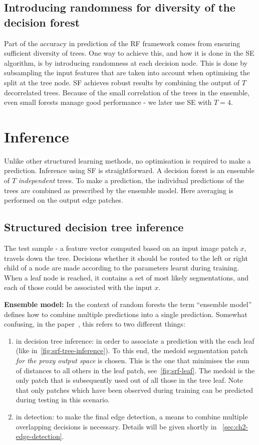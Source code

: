 \subsection{Introducing randomness for diversity of the decision forest}
Part of the accuracy in prediction of the RF framework comes from ensuring sufficient diversity of trees. One way to achieve this, and how it is done in the SE algorithm, is by introducing randomness at each decision node. This is done by subsampling the input features that are taken into account when optimising the split at the tree node. SF achieves robust results by combining the output of $T$ decorrelated trees. Because of the small correlation of the trees in the ensemble, even small forests manage good performance - we later use SE with $T=4$.

\section{Inference}
Unlike other structured learning methods, no optimisation is required to make a prediction. Inference using SF is straightforward. A decision forest is an ensemble of $T$ \textit{independent} trees. To make a prediction, the individual predictions of the trees are combined as prescribed by the ensemble model. Here averaging is performed on the output edge patches.

\subsection{Structured decision tree inference}
The test sample - a feature vector computed based on an input image patch $x$, travels down the tree. Decisions whether it should be routed to the left or right child of a node are made according to the parameters learnt during training. When a leaf node is reached, it contains a set of most likely segmentations, and each of those could be associated with the input $x$.

\textbf{Ensemble model:} In the context of random forests the term ``ensemble model'' defines how to combine multiple predictions into a single prediction. Somewhat confusing, in the paper~\cite{DollarICCV13edges}, this refers to two different things:
\begin{enumerate}
 \item{in decision tree inference:} in order to associate a prediction with the each leaf (like in~\ref{fig:srf-tree-inference}). To this end, the medoid segmentation patch \textit{for the proxy output space} is chosen. This is the one that minimises the sum of distances to all others in the leaf patch, see~\ref{fig:srf-leaf}. The medoid is the only patch that is subsequently used out of all those in the tree leaf. Note that only patches which have been observed during training can be predicted during testing %
 in this scenario.
 \item{in detection:} to make the final edge detection, a means to combine multiple overlapping decisions is necessary. Details will be given shortly in \textsection~\ref{sec:ch2-edge-detection}.
\end{enumerate}

